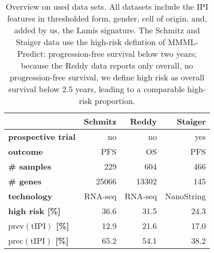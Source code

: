 \begin{table}
    \centering
    \begin{tabular}{lrrr}
        \hline
        & \textbf{Schmitz \cite{schmitz18}} & \textbf{Reddy \cite{reddy17}} & \textbf{Staiger \cite{staiger20}} \\
        \hline
        \textbf{prospective trial} & no & no & yes \\
        \textbf{outcome} & PFS & OS & PFS \\
        \textbf{\# samples} & \num{229} & \num{604} & \num{466} \\
        \textbf{\# genes} & \num{25066} & \num{13302} & \num{145} \\
        \textbf{technology} & RNA-seq & RNA-seq & NanoString \\
        \textbf{high risk [\%]} & \num{36.6} & \num{31.5}\footnotemark & \num{24.3} \\
        \textbf{$\text{prev}(\text{tIPI})$ [\%]} & \num{12.9} & \num{21.6} & \num{17.0} \\
        \textbf{$\text{prec}(\text{tIPI})$ [\%]} & \num{65.2} & \num{54.1} & \num{38.2} \\
        \hline
    \end{tabular}
    \caption{Overview on used data sets. All datasets include the IPI features in thresholded form, 
        gender, cell of origin, and, added by us, the Lamis signature. The Schmitz and Staiger 
        data use the high-risk defintion of MMML-Predict: progression-free survival below two years; 
        because the Reddy data reports only overall, no progression-free survival, we define high risk 
        as overall survival below \num{2.5} years, leading to a comparable high-risk proportion.}
        \label{table:data}
\end{table}